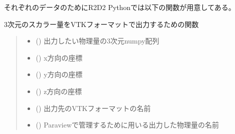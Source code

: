 \documentclass[letterpaper,10pt,dvipdfmx,report]{sphinxmanual}
\begin{document}
\sphinxAtStartPar
それぞれのデータのためにR2D2 Pythonでは以下の関数が用意してある。

\begin{fulllineitems}
\label{\detokenize{paraview:R2D2.vtk.write_3D}}
\pysigstartsignatures
{}
\pysigstopsignatures
\sphinxAtStartPar
3次元のスカラー量をVTKフォーマットで出力するための関数
\begin{quote}\begin{description}
\begin{itemize}
\item {} 
\sphinxAtStartPar
{} () \sphinxhyphen{}\sphinxhyphen{} 出力したい物理量の3次元numpy配列

\item {} 
\sphinxAtStartPar
{} () \sphinxhyphen{}\sphinxhyphen{} x方向の座標

\item {} 
\sphinxAtStartPar
{} () \sphinxhyphen{}\sphinxhyphen{} y方向の座標

\item {} 
\sphinxAtStartPar
{} () \sphinxhyphen{}\sphinxhyphen{} z方向の座標

\item {} 
\sphinxAtStartPar
{} () \sphinxhyphen{}\sphinxhyphen{} 出力先のVTKフォーマットの名前

\item {} 
\sphinxAtStartPar
{} () \sphinxhyphen{}\sphinxhyphen{} Paraviewで管理するために用いる出力した物理量の名前

\end{itemize}

\end{description}\end{quote}

\end{fulllineitems}
\end{document}
